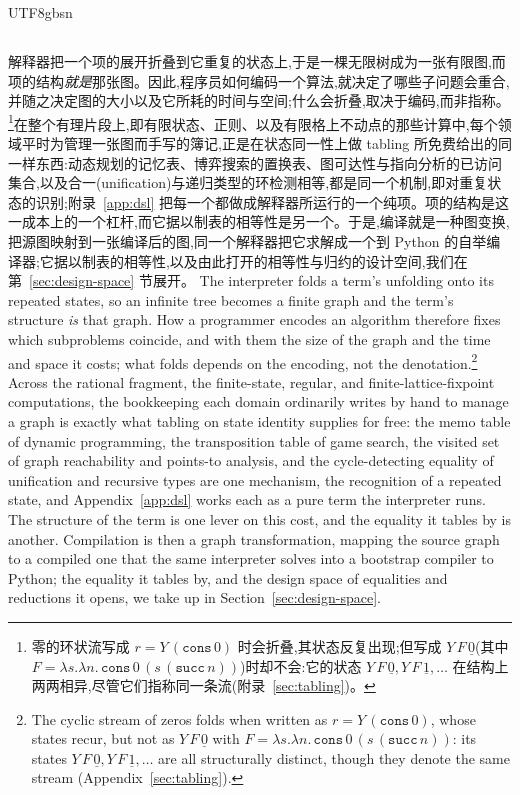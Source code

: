 \begin{CJK*}{UTF8}{gbsn}
  \subsection{}\label{sec:graphs}
  \ifTablambdaChinese
  解释器把一个项的展开折叠到它重复的状态上,于是一棵无限树成为一张有限图,而项的结构\emph{就是}那张图。因此,程序员如何编码一个算法,就决定了哪些子问题会重合,并随之决定图的大小以及它所耗的时间与空间;什么会折叠,取决于编码,而非指称。\footnote{零的环状流写成 $r = Y\,(\mathtt{cons}\,0)$ 时会折叠,其状态反复出现;但写成 $Y\,F\,\underline{0}$(其中 $F = \lambda s.\lambda n.\,\mathtt{cons}\,0\,(s\,(\mathtt{succ}\,n))$)时却不会:它的状态 $Y\,F\,\underline{0}, Y\,F\,\underline{1}, \dots$ 在结构上两两相异,尽管它们指称同一条流(附录~\ref{sec:tabling})。}在整个有理片段上,即有限状态、正则、以及有限格上不动点的那些计算中,每个领域平时为管理一张图而手写的簿记,正是在状态同一性上做 tabling 所免费给出的同一样东西:动态规划的记忆表、博弈搜索的置换表、图可达性与指向分析的已访问集合,以及合一(unification)与递归类型的环检测相等,都是同一个机制,即对重复状态的识别;附录~\ref{app:dsl} 把每一个都做成解释器所运行的一个纯项。项的结构是这一成本上的一个杠杆,而它据以制表的相等性是另一个。于是,编译就是一种图变换,把源图映射到一张编译后的图,同一个解释器把它求解成一个到 Python 的自举编译器;它据以制表的相等性,以及由此打开的相等性与归约的设计空间,我们在第~\ref{sec:design-space} 节展开。
  \else
  The interpreter folds a term's unfolding onto its repeated states, so an infinite tree becomes a finite graph and the term's structure \emph{is} that graph. How a programmer encodes an algorithm therefore fixes which subproblems coincide, and with them the size of the graph and the time and space it costs; what folds depends on the encoding, not the denotation.\footnote{The cyclic stream of zeros folds when written as $r = Y\,(\mathtt{cons}\,0)$, whose states recur, but not as $Y\,F\,\underline{0}$ with $F = \lambda s.\lambda n.\,\mathtt{cons}\,0\,(s\,(\mathtt{succ}\,n))$: its states $Y\,F\,\underline{0}, Y\,F\,\underline{1}, \dots$ are all structurally distinct, though they denote the same stream (Appendix~\ref{sec:tabling}).} Across the rational fragment, the finite-state, regular, and finite-lattice-fixpoint computations, the bookkeeping each domain ordinarily writes by hand to manage a graph is exactly what tabling on state identity supplies for free: the memo table of dynamic programming, the transposition table of game search, the visited set of graph reachability and points-to analysis, and the cycle-detecting equality of unification and recursive types are one mechanism, the recognition of a repeated state, and Appendix~\ref{app:dsl} works each as a pure term the interpreter runs. The structure of the term is one lever on this cost, and the equality it tables by is another. Compilation is then a graph transformation, mapping the source graph to a compiled one that the same interpreter solves into a bootstrap compiler to Python; the equality it tables by, and the design space of equalities and reductions it opens, we take up in Section~\ref{sec:design-space}.
  \fi


\end{CJK*}
